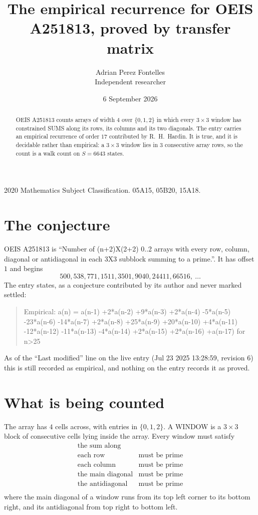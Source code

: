 \documentclass[11pt,a4paper]{article}
\title{The empirical recurrence for OEIS A251813, proved by transfer matrix}
\author{Adrian Perez Fontelles\\ \small Independent researcher}
\date{6 September 2026}
\theoremstyle{plain}
\theoremstyle{definition}
\begin{document}
\maketitle

\begin{abstract}
OEIS A251813 counts arrays of width $4$ over $\{0,1,2\}$ in which every $3\times3$ window has
constrained SUMS along its rows, its columns and its two diagonals. The entry carries an
empirical recurrence of order $17$ contributed by R.~H.~Hardin. It is true, and it is
decidable rather than empirical: a $3\times3$ window lies in $3$ consecutive array rows,
so the count is a walk count on $S=6643$ states.
\end{abstract}

\noindent\small 2020 Mathematics Subject Classification. 05A15, 05B20, 15A18.\normalsize

\section{The conjecture}

OEIS A251813 is ``Number of (n+2)X(2+2) 0..2 arrays with every row, column, diagonal or antidiagonal in each 3X3 subblock summing to a prime.''. It has offset $1$ and begins
\[
500, 538, 771, 1511, 3501, 9040, 24411, 66516,\ \dots
\]
The entry states, as a conjecture contributed by its author and never marked settled:
\begin{quote}
Empirical: a(n) = a(n-1) +2*a(n-2) +9*a(n-3) +2*a(n-4) -5*a(n-5) -23*a(n-6) -14*a(n-7) +2*a(n-8) +25*a(n-9) +20*a(n-10) +4*a(n-11) -12*a(n-12) -11*a(n-13) -4*a(n-14) +2*a(n-15) +2*a(n-16) +a(n-17) for n>25
\end{quote}
As of the ``Last modified'' line on the live entry (Jul 23 2025 13:28:59, revision 6) this is still
recorded as empirical, and nothing on the entry records it as proved.

\section{What is being counted}

The array has $4$ cells across, with entries in $\{0,1,2\}$. A WINDOW is a $3\times3$ block
of consecutive cells lying inside the array. Every window must satisfy
\[
\begin{array}{ll}
\text{the sum along} & \text{} \\[2pt]
\text{each row} & \text{must be prime} \\
\text{each column} & \text{must be prime} \\
\text{the main diagonal} & \text{must be prime} \\
\text{the antidiagonal} & \text{must be prime} \\
\end{array}
\]
where the main diagonal of a window runs from its top left corner to its bottom right, and its
antidiagonal from top right to bottom left.
\end{document}
